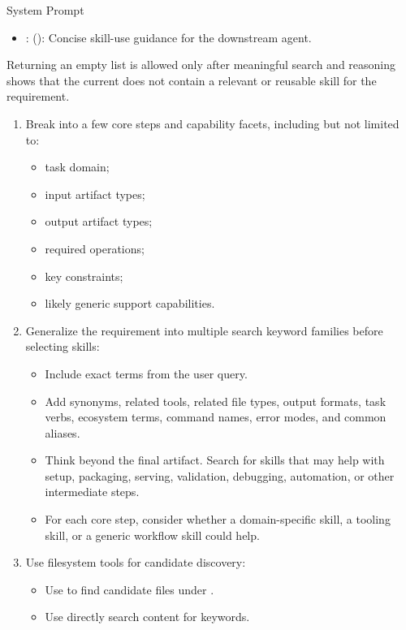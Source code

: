 \begin{svpromptbox}{System Prompt}
\begin{itemize}
\item {}: (): Concise skill-use guidance for the downstream agent.
\end{itemize}
\smallskip
Returning an empty  list is allowed only after meaningful search and reasoning shows that the current  does not contain a relevant or reusable skill for the requirement.\par
\smallskip
{}
\smallskip
{}
\smallskip
\begin{enumerate}
\item Break  into a few core steps and capability facets, including but not limited to:
\begin{itemize}
\item task domain;
\item input artifact types;
\item output artifact types;
\item required operations;
\item key constraints;
\item likely generic support capabilities.
\end{itemize}
\item Generalize the requirement into multiple search keyword families before selecting skills:
\begin{itemize}
\item Include exact terms from the user query.
\item Add synonyms, related tools, related file types, output formats, task verbs, ecosystem terms, command names, error modes, and common aliases.
\item Think beyond the final artifact. Search for skills that may help with setup, packaging, serving, validation, debugging, automation, or other intermediate steps.
\item For each core step, consider whether a domain-specific skill, a tooling skill, or a generic workflow skill could help.
\end{itemize}
\item Use filesystem tools for candidate discovery:
\begin{itemize}
\item Use  to find candidate  files under .
\item Use  directly search  content for keywords.

\end{itemize}
\end{enumerate}
\end{svpromptbox}
